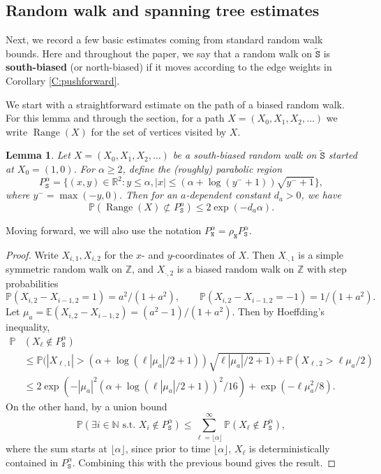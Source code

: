 \documentclass[11pt,twoside]{amsart}
\theoremstyle{plain}
\newtheorem{lem}[thm]{Lemma}
\numberwithin{quest}{section}
\theoremstyle{remark}
\numberwithin{rem}{section}
\theoremstyle{definition}
\newcommand{\Z}{\mathbb{Z}}
\newcommand{\N}{\mathbb{N}}
\newcommand{\R}{\mathbb{R}}
\renewcommand{\P}{\mathbb{P}}
\newcommand{\E}{\mathbb{E}}
\renewcommand{\tt}[1]{{\mathtt{#1}}}
\begin{document}
	
	
	
	
	
	
	
	\subsection{Random walk and spanning tree estimates}
	\label{S:rw-estimates}
	
	Next, we record a few basic estimates coming from standard random walk bounds. Here and throughout the paper, we say that a random walk on $\tt{\tilde S}$ is \textbf{south-biased} (or north-biased) if it moves according to the edge weights in Corollary \ref{C:pushforward}.
	
	We start with a straightforward estimate on the path of a biased random walk. For this lemma and through the section, for a path $X = (X_0, X_1, X_2, \dots)$ we write $\operatorname{Range}(X)$ for the set of vertices visited by $X$.
	
	\begin{lem}
		\label{L:lerw-estimate-basic}
		Let $X = (X_0, X_1, X_2, \dots)$ be a south-biased random walk on $\tt{\tilde S}$ started at $X_0 = (1, 0)$. For $\alpha \ge 2$, define the (roughly) parabolic region
		$$
		P^\alpha_\tt{S} = \{(x, y) \in \R^2 : y \le \alpha, |x| \le (\alpha + \log(y^- + 1))\sqrt{y^- + 1}\},
		$$
		where $y^- = \max(-y, 0)$.
		Then for an $a$-dependent constant $d_a > 0$, we have
		$$
		\P(\operatorname{Range}(X) \not\subset P^n_\tt{S}) \le 2 \exp (-d_a \alpha).
		$$
	\end{lem} 
	Moving forward, we will also use the notation $P^\alpha_\tt{N} = \rho_\tt{N} P^\alpha_\tt{S}$.
	
	\begin{proof}
		Write $X_{i, 1}, X_{i, 2}$ for the $x$- and $y$-coordinates of $X$. Then $X_{\cdot, 1}$ is a simple symmetric random walk on $\Z$, and $X_{\cdot, 2}$ is a biased random walk on $\Z$ with step probabilities
		$$
		\P(X_{i, 2} - X_{i-1, 2} = 1) = a^2/(1 + a^2), \qquad \P(X_{i, 2} - X_{i-1, 2} = - 1) = 1/(1 + a^2).
		$$
		Let $\mu_a = \E(X_{i, 2} - X_{i-1, 2}) = (a^2-1)/(1 + a^2)$. Then by Hoeffding's inequality,
		\begin{align*}
			\P&(X_\ell \notin P^\alpha_\tt{S}) \\
			&\le \P\Big(|X_{\ell,1}| > (\alpha + \log (\ell |\mu_a|/2 + 1)) \sqrt{\ell |\mu_a|/2 + 1}\Big) + \P(X_{\ell,2} > \ell \mu_a/2) \\
			&\le 2 \exp(- |\mu_a|^2 (\alpha + \log(\ell |\mu_a|/2 + 1))^2/16) + \exp(- \ell \mu_a^2/8).
		\end{align*}
		On the other hand, by a union bound
		$$
		\P(\exists i \in \N \text{ s.t. } X_i \notin P^\alpha_\tt{S}) \le \sum_{\ell = \lfloor \alpha \rfloor }^\infty \P(X_\ell \notin P^\alpha_\tt{S}),
		$$
		where the sum starts at $\lfloor \alpha \rfloor$, since prior to time $\lfloor \alpha \rfloor$, $X_\ell$ is deterministically contained in $P^\alpha_\tt{S}$. Combining this with the previous bound gives the result.
	\end{proof}
	
\end{document}

